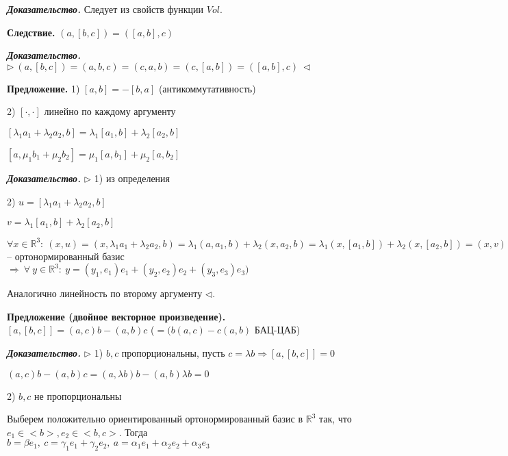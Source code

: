\vspace{\baselineskip}
\textit{\textbf{Доказательство.}} Следует из свойств функции $Vol$.

\vspace{\baselineskip}
\textbf{Следствие.} $(a, [b, c]) = ([a, b], c)$

\vspace{\baselineskip}
\textbf{\textit{Доказательство.}} $\rhd \ (a, [b, c]) = (a, b, c) = (c, a, b) = (c, [a, b]) = ([a, b], c) \ \lhd$

\vspace{\baselineskip}
\textbf{Предложение.} 1) $[a, b] = -[b, a]$ (антикоммутативность)

2) $[\cdot, \cdot]$ линейно по каждому аргументу

$[\lambda_1 a_1 + \lambda_2 a_2, b] = \lambda_1 [a_1, b] + \lambda_2 [a_2, b]$

$[a, \mu_1 b_1 + \mu_2 b_2] = \mu_1 [a, b_1] + \mu_2 [a, b_2]$

\vspace{\baselineskip}
\textbf{\textit{Доказательство.}} $\rhd$ 1) из определения

2) $u = [\lambda_1 a_1 + \lambda_2 a_2, b]$

$v = \lambda_1 [a_1, b] + \lambda_2 [a_2, b]$

$\forall x \in \mathbb{R}^3 : \ (x, u) = (x, \lambda_1 a_1 + \lambda_2 a_2, b) = \lambda_1 (a, a_1, b) + \lambda_2 (x, a_2, b) = \lambda_1 (x, [a_1, b]) + \lambda_2 (x, [a_2, b]) = (x, v) \Rightarrow u = v \ (e_1, e_2, e_3$ -- ортонормированный базис $\Rightarrow \ \forall \ y \in \mathbb{R}^3 : \ y = (y_1, e_1) e_1 + (y_2, e_2) e_2 + (y_3, e_3) e_3)$

Аналогично линейность по второму аргументу $\lhd$.

\vspace{\baselineskip}
\textbf{Предложение (двойное векторное произведение).} $[a, [b, c]] = (a, c) b - (a, b) c$ ($= (b (a, c) - c (a, b)$ БАЦ-ЦАБ)

\vspace{\baselineskip}
\textbf{\textit{Доказательство.}} $\rhd$ 1) $b, c$ пропорциональны, пусть $c = \lambda b \Rightarrow [a, [b, c]] = 0$

$(a, c)b - (a, b) c = (a, \lambda b)b - (a, b) \lambda b = 0$

2) $b, c$ не пропорциональны

Выберем положительно ориентированный ортонормированный базис в $\mathbb{R}^3$ так, что $e_1 \in <b>, e_2 \in <b, c>$. Тогда $b = \beta e_1, \ c = \gamma_1 e_1 + \gamma_2 e_2, \ a = \alpha_1 e_1 + \alpha_2 e_2 + \alpha_3 e_3$

